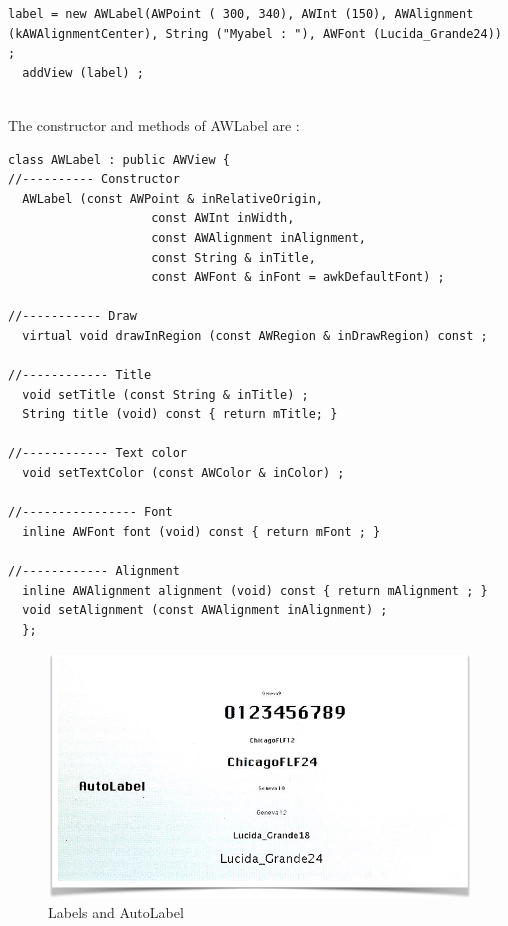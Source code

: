 \documentclass[a4paper,11pt]{extarticle}
\begin{document}
\begin{lstlisting}[language=Arduinonl]
  label = new AWLabel(AWPoint ( 300, 340), AWInt (150), AWAlignment (kAWAlignmentCenter), String ("Myabel : "), AWFont (Lucida_Grande24)) ;
  addView (label) ;
\end{lstlisting}

~\\ The constructor and methods of AWLabel are :

\begin{lstlisting}[language=Arduinonl]
class AWLabel : public AWView {
//---------- Constructor
  AWLabel (const AWPoint & inRelativeOrigin,
                    const AWInt inWidth,
                    const AWAlignment inAlignment,
                    const String & inTitle,
                    const AWFont & inFont = awkDefaultFont) ;

//----------- Draw
  virtual void drawInRegion (const AWRegion & inDrawRegion) const ;

//------------ Title
  void setTitle (const String & inTitle) ;
  String title (void) const { return mTitle; }

//------------ Text color
  void setTextColor (const AWColor & inColor) ;

//---------------- Font
  inline AWFont font (void) const { return mFont ; }

//------------ Alignment
  inline AWAlignment alignment (void) const { return mAlignment ; }
  void setAlignment (const AWAlignment inAlignment) ;
  };
\end{lstlisting}

\begin{figure}[htbp]
   \centering
   \includegraphics[scale=0.55]{AWFig9.png} 
   \caption{Labels and AutoLabel}
   \label{fig: 9}
\end{figure}
\end{document}
